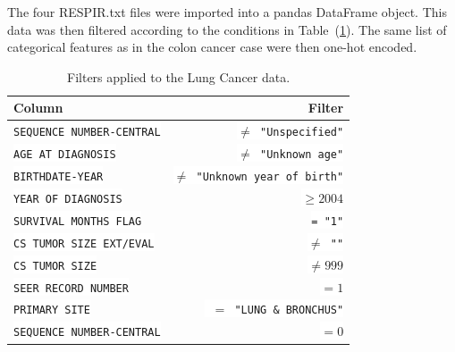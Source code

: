 \documentclass[a4paper,11pt]{article}
\newcommand{\codewhite}[1]{\colorbox{white}{\texttt{#1}}}
\begin{document}

The four RESPIR.txt files were imported into a pandas DataFrame object.
This data was then filtered according to the conditions in Table~(\ref{tab:lungfilter}).
The same list of categorical features as in the colon cancer case were then one-hot encoded.



\begin{table}[tbp]
\begin{center}
\begin{tabular}{lr}
\toprule
 Column &  Filter \\
\midrule
\codewhite{SEQUENCE NUMBER-CENTRAL} & \codewhite{$\neq$ "Unspecified"} \\
\codewhite{AGE AT DIAGNOSIS} & \codewhite{$\neq$ "Unknown age"} \\
\codewhite{BIRTHDATE-YEAR} & \codewhite{$\neq$ "Unknown year of birth"} \\
\codewhite{YEAR OF DIAGNOSIS} & \codewhite{$\geq 2004$} \\
\codewhite{SURVIVAL MONTHS FLAG} & \codewhite{= "1"}\\
\codewhite{CS TUMOR SIZE EXT/EVAL} & \codewhite{$\neq$ ""} \\
\codewhite{CS TUMOR SIZE} & \codewhite{$\neq 999$} \\
\codewhite{SEER RECORD NUMBER} & \codewhite{$= 1$} \\
\codewhite{PRIMARY SITE} & \codewhite{ $=$ "LUNG \& BRONCHUS"} \\
\codewhite{SEQUENCE NUMBER-CENTRAL} & \codewhite{$=0$} \\
\bottomrule
\end{tabular}
\caption{\label{tab:lungfilter} Filters applied to the Lung Cancer data.}
\end{center}
\end{table}


\end{document}
